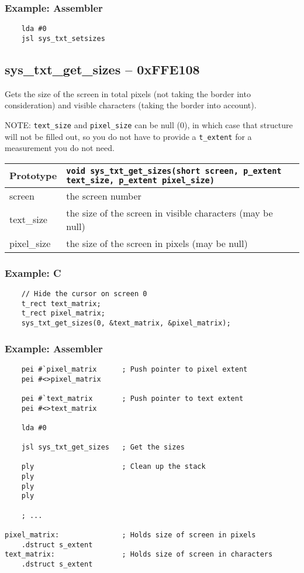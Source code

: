\subsubsection*{Example: Assembler}
\begin{verbatim}
    lda #0
    jsl sys_txt_setsizes
\end{verbatim}

\subsection*{sys\_txt\_get\_sizes -- 0xFFE108}
Gets the size of the screen in total pixels (not taking the border into consideration) and visible characters (taking the border into account).

NOTE: \verb+text_size+ and \verb+pixel_size+ can be null (0), in which case that structure will not be filled out, so you do not have to provide a \verb+t_extent+ for a measurement you do not need.

\begin{tabular}{|l||l|} \hline
Prototype & \lstinline!void sys_txt_get_sizes(short screen, p_extent text_size, p_extent pixel_size)! \\ \hline
screen & the screen number  \\ \hline
text\_size & the size of the screen in visible characters (may be null) \\ \hline
pixel\_size & the size of the screen in pixels (may be null) \\ \hline
\end{tabular}

\subsubsection*{Example: C}
\begin{lstlisting}
    // Hide the cursor on screen 0
    t_rect text_matrix;
    t_rect pixel_matrix;
    sys_txt_get_sizes(0, &text_matrix, &pixel_matrix);    
\end{lstlisting}

\subsubsection*{Example: Assembler}
\begin{verbatim}
    pei #`pixel_matrix      ; Push pointer to pixel extent
    pei #<>pixel_matrix

    pei #`text_matrix       ; Push pointer to text extent
    pei #<>text_matrix

    lda #0

    jsl sys_txt_get_sizes   ; Get the sizes

    ply                     ; Clean up the stack
    ply
    ply
    ply

    ; ...

pixel_matrix:               ; Holds size of screen in pixels
    .dstruct s_extent
text_matrix:                ; Holds size of screen in characters
    .dstruct s_extent
\end{verbatim}


